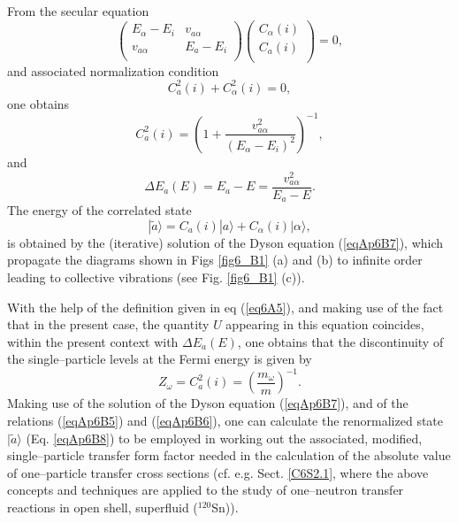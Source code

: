 \begin{subappendices}
  From the secular equation
\begin{equation}
\left(
\begin{matrix}
E_\alpha-E_i & v_{a\alpha}\\  
v_{a \alpha} & E_a-E_i \\ 
\end{matrix}
\right)
\left(
\begin{matrix}
C_\alpha(i)\\  
C_a(i)\\ 
\end{matrix}
\right)=0,
\end{equation}
and associated normalization condition
\begin{equation}\label{eqAp6B5}
C_a^2(i)+C_\alpha^2(i)=0,
 \end{equation}
one obtains
\begin{equation}\label{eqAp6B6}
C_a^2(i)=\left(1+\frac{v_{a\alpha}^2}{(E_\alpha-E_i)^2}\right)^{-1},
 \end{equation}
and 
\begin{equation}\label{eqAp6B7}
\Delta E_a(E)=E_a-E=\frac{v_{a\alpha}^2}{E_a-E}.
 \end{equation}
The energy of the correlated state
\begin{equation}\label{eqAp6B8}
|\tilde a\rangle=C_a(i)| a\rangle+C_\alpha (i)| \alpha\rangle,
 \end{equation}
is obtained by the (iterative) solution of the Dyson equation (\ref{eqAp6B7}), which propagate the diagrams shown in Figs \ref{fig6_B1} (a) and (b) to infinite order leading to collective vibrations (see Fig. \ref{fig6_B1} (c)).

With the help of the definition given in eq (\ref{eq6A5}), and making use of the fact that in the present case, the quantity $U$ appearing in this equation coincides, within the present context with $\Delta E_a(E)$, one obtains that the discontinuity of the single--particle levels at the Fermi energy is given by
\begin{equation}\label{eqAp6B4}
Z_\omega=C_a^2(i)=\left(\frac{m_\omega}{m}\right)^{-1}.
 \end{equation}
 Making use of the solution of  the Dyson equation (\ref{eqAp6B7}), and of the relations (\ref{eqAp6B5}) and (\ref{eqAp6B6}), one can calculate the renormalized state $|\tilde a\rangle$ (Eq. \ref{eqAp6B8}) to be employed in working out the associated, modified, single--particle transfer form factor needed in the calculation of the absolute value of one--particle transfer cross sections (cf. e.g. Sect. \ref{C6S2.1}, where the  above concepts and techniques are applied to the study of one--neutron transfer reactions in open shell, superfluid ($^{120}$Sn)).	 
 

\end{subappendices}
